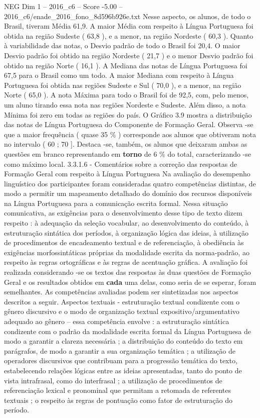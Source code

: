 \begin{textsample}{NEG Dim 1 – 2016\_c6 – Score -5.00 – 2016\_c6/enade\_2016\_fono\_8d596b926e.txt}
Nesse aspecto, os alunos, de todo o Brasil, tiveram Média 61,9.
A maior Média com respeito à Língua Portuguesa foi obtida na região Sudeste ( 63,8 ), e a menor, na região Nordeste ( 60,3 ).
Quanto à variabilidade das notas, o Desvio padrão de todo o Brasil foi 20,4.
O maior Desvio padrão foi obtido na região Nordeste ( 21,7 ) e o menor Desvio padrão foi obtido na região Norte ( 16,1 ).
A Mediana das notas de Língua Portuguesa foi 67,5 para o Brasil como um todo.
A maior Mediana com respeito à Língua Portuguesa foi obtida nas regiões Sudeste e Sul ( 70,0 ), e a menor, na região Norte ( 65,0 ).
A nota Máxima para todo o Brasil foi de 92,5, com, pelo menos, um aluno tirando essa nota nas regiões Nordeste e Sudeste.
Além disso, a nota Mínima foi zero em todas as regiões do país.
O Gráfico 3.9 mostra a distribuição das notas de Língua Portuguesa do Componente de Formação Geral.
Observa -se que a maior frequência ( quase 35 \% ) corresponde aos alunos que obtiveram nota no intervalo ( 60 ; 70 ].
Destaca -se, também, os alunos que deixaram ambas as questões em branco representando em \textbf{torno} de 6 \% do total, caracterizando -se como máximo local. 3.3.1.6 - Comentários sobre a correção das respostas de Formação Geral com respeito à Língua Portuguesa Na avaliação do desempenho linguístico dos participantes foram consideradas quatro competências distintas, de modo a permitir um mapeamento detalhado do domínio dos recursos disponíveis na Língua Portuguesa para a comunicação escrita formal.
Nessa situação comunicativa, as exigências para o desenvolvimento desse tipo de texto dizem respeito : à adequação da seleção vocabular, ao desenvolvimento do conteúdo, à estruturação sintática dos períodos, à organização lógica das ideias, à utilização de procedimentos de encadeamento textual e de referenciação, à obediência às exigências morfossintáticas próprias da modalidade escrita da norma-padrão, ao respeito às regras ortográficas e às regras de acentuação gráfica.
A avaliação foi realizada considerando -se os textos das respostas às duas questões de Formação Geral e os resultados obtidos em \textbf{cada} uma delas, como seria de se esperar, foram semelhantes.
As competências avaliadas podem ser sintetizadas nos aspectos descritos a seguir.
Aspectos textuais - estruturação textual condizente com o gênero discursivo e o modo de organização textual expositivo/argumentativo adequado ao gênero – essa competência envolve : a estruturação sintática condizente com o padrão da modalidade escrita formal da Língua Portuguesa de modo a garantir a clareza necessária ; a distribuição do conteúdo do texto em parágrafos, de modo a garantir a sua organização temática ; a utilização de operadores discursivos que contribuam para a progressão temática do texto, estabelecendo relações lógicas entre as ideias apresentadas, tanto do ponto de vista intrafrasal, como do interfrasal ; a utilização de procedimentos de referenciação lexical e pronominal que permitam a retomada de referentes textuais ; o respeito às regras de pontuação como fator de estruturação do período.

\end{textsample}
